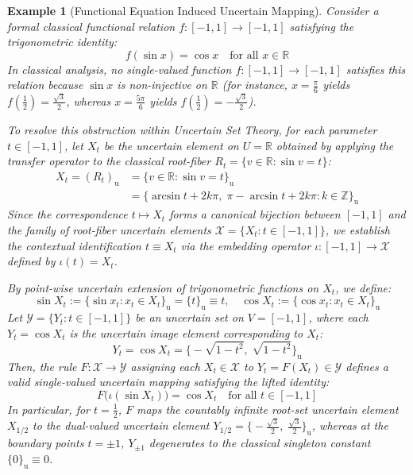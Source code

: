 \documentclass[a4paper,12pt, twoside]{memoir}
\newtheorem{example}{Example}[chapter]
\newcommand{\tbd}[1]{\mathcal{#1}} %
\newcommand{\s}[1]{\{#1\}_\mathrm{u}} %
\begin{document}
	\begin{example}[Functional Equation Induced Uncertain Mapping]
		Consider a formal classical functional relation $f : [-1, 1] \to [-1, 1]$ satisfying the trigonometric identity:
		\[
		f(\sin x) = \cos x \quad \text{for all } x \in \mathbb{R}
		\]
		In classical analysis, no single-valued function $f : [-1, 1] \to [-1, 1]$ satisfies this relation because $\sin x$ is non-injective on $\mathbb{R}$ (for instance, $x = \frac{\pi}{6}$ yields $f(\frac{1}{2}) = \frac{\sqrt{3}}{2}$, whereas $x = \frac{5\pi}{6}$ yields $f(\frac{1}{2}) = -\frac{\sqrt{3}}{2}$).
		
		To resolve this obstruction within Uncertain Set Theory, for each parameter $t \in [-1, 1]$, let $X_t$ be the uncertain element on $U = \mathbb{R}$ obtained by applying the transfer operator to the classical root-fiber $R_t = \{ v \in \mathbb{R} : \sin v = t \}$:
		\begin{align*}
			X_t = (R_t)_\mathrm{u} &= \big\{ v \in \mathbb{R} : \sin v = t \big\}_\mathrm{u} \\
			&= \big\{ \arcsin t + 2k\pi, \; \pi - \arcsin t + 2k\pi : k \in \mathbb{Z} \big\}_\mathrm{u}
		\end{align*}
		Since the correspondence $t \mapsto X_t$ forms a canonical bijection between $[-1, 1]$ and the family of root-fiber uncertain elements $\tbd{X} = \{ X_t : t \in [-1, 1] \}$, we establish the contextual identification $t \equiv X_t$ via the embedding operator $\iota : [-1, 1] \to \tbd{X}$ defined by $\iota(t) = X_t$.
		
		By point-wise uncertain extension of trigonometric functions on $X_t$, we define:
		\[
		\sin X_t := \big\{ \sin x_t : x_t \in X_t \big\}_\mathrm{u} = \s{t} \equiv t, \quad \cos X_t := \big\{ \cos x_t : x_t \in X_t \big\}_\mathrm{u}
		\]
		Let $\tbd{Y} = \{ Y_t : t \in [-1, 1] \}$ be an uncertain set on $V = [-1, 1]$, where each $Y_t = \cos X_t$ is the uncertain image element corresponding to $X_t$:
		\[
		Y_t = \cos X_t = \big\{ -\sqrt{1 - t^2}, \; \sqrt{1 - t^2} \big\}_\mathrm{u}
		\]
		Then, the rule $F : \tbd{X} \to \tbd{Y}$ assigning each $X_t \in \tbd{X}$ to $Y_t = F(X_t) \in \tbd{Y}$ defines a valid single-valued uncertain mapping satisfying the lifted identity:
		\[
		F\big(\iota(\sin X_t)\big) = \cos X_t \quad \text{for all } t \in [-1, 1]
		\]
		In particular, for $t = \frac{1}{2}$, $F$ maps the countably infinite root-set uncertain element $X_{1/2}$ to the dual-valued uncertain element $Y_{1/2} = \big\{ -\frac{\sqrt{3}}{2}, \; \frac{\sqrt{3}}{2} \big\}_\mathrm{u}$, whereas at the boundary points $t = \pm 1$, $Y_{\pm 1}$ degenerates to the classical singleton constant $\s{0} \equiv 0$.
	\end{example}
\end{document}

